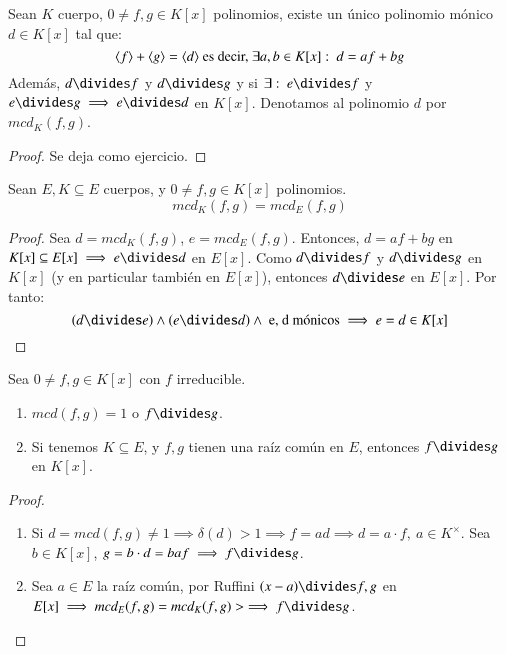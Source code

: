 \begin{thm}
    Sean $K$ cuerpo, $0 \neq f, g \in K[x]$ polinomios, existe un único polinomio mónico $d \in K[x]$ tal que:
    $$
        \langle f\rangle + \langle g\rangle = \langle d\rangle \text{ es decir, } \exists a,b \in K[x] :\ d = af + bg
    $$
    Además, $d \divides f$ y $d \divides g$ y si $\exists :\ e \divides f$ y $e \divides g \implies e \divides d$ en $K[x]$.
    Denotamos al polinomio $d$ por $mcd_K(f, g)$.
\end{thm}
\begin{proof}
    Se deja como ejercicio.
\end{proof}

\begin{pro}
    Sean $E, K \subseteq E$ cuerpos, y $0 \neq f, g \in K[x]$ polinomios.
    $$
        mcd_K(f, g) = mcd_E(f, g)
    $$
\end{pro}

\begin{proof}
    Sea $d = mcd_K(f, g)$, $e = mcd_E(f, g)$. Entonces, $d = af + bg$ en $K[x] \subseteq E[x] \implies e\divides d $ en $E[x]$. Como $d\divides f$ y $d \divides g$ en $K[x]$ (y en particular también en $E[x]$), entonces $d \divides e$ en $E[x]$. Por tanto:
    $$
        (d \divides e) \land( e \divides d) \land \text{ e, d mónicos} \implies e=d \in K[x]
    $$
\end{proof}

\begin{cor}
    Sea $0 \neq f, g \in K[x]$ con $f$ irreducible.\\
    \begin{enumerate}
        \item $mcd(f, g) = 1$ o $f \divides g$.
        \item Si tenemos $K \subseteq E$, y $f, g$ tienen una raíz común en $E$, entonces $f \divides g$ en $K[x]$.
    \end{enumerate}
\end{cor}

\begin{proof}$ $
    \begin{enumerate}
        \item Si $d = mcd(f, g) \neq 1 \implies \delta(d) > 1 \implies f = ad \implies d = a \cdot f,\ a \in K^\times$. Sea $b \in K[x]$, $g = b\cdot d = b a f \implies f \divides g$.
        \item Sea $a \in E$ la raíz común, por Ruffini $(x - a) \divides f, g$ en $E[x] \implies mcd_E(f, g) = mcd_K(f, g) > \implies f \divides g$.
    \end{enumerate}
\end{proof}

